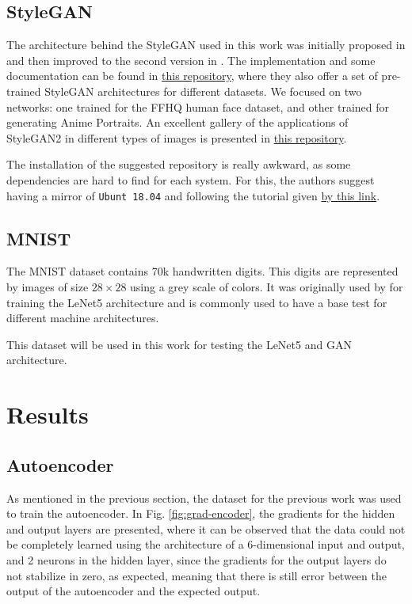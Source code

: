 \documentclass[conference]{IEEEtran}
\theoremstyle{definition}
\theoremstyle{remark}
\theoremstyle{remark}
\begin{document}
\subsection{StyleGAN}
The architecture behind the StyleGAN used in this work was initially proposed in
\parencite{karras2019style} and then improved to the second version in
\parencite{karras2020analyzing}. The implementation and some documentation can
be found in \href{https://github.com/NVlabs/stylegan2}{this repository}, where
they also offer a set of pre-trained StyleGAN architectures for different
datasets. We focused on two networks: one trained for the FFHQ human face
dataset, and other trained for generating Anime Portraits. An excellent gallery
of the applications of StyleGAN2 in different types of images is presented in
\href{https://github.com/justinpinkney/awesome-pretrained-stylegan2}{this
  repository}.

The installation of the suggested repository is really awkward, as some
dependencies are hard to find for each system. For this, the authors suggest
having a mirror of \texttt{Ubunt 18.04} and following the tutorial given
\href{https://bit.ly/2VUagNB}{by this link}.

\subsection{MNIST}
The MNIST dataset contains 70k handwritten digits. This digits are represented
by images of size $28 \times 28$ using a grey scale of colors. It was originally
used by \parencite{lecun1998gradient} for training the LeNet5 architecture and
is commonly used to have a base test for different machine architectures.

This dataset will be used in this work for testing the LeNet5 and GAN
architecture.

\section{Results}\label{sec:res}

\subsection{Autoencoder}
As mentioned in the previous section, the dataset for the previous work was used
to train the autoencoder. In Fig. \ref{fig:grad-encoder}, the gradients for the
hidden and output layers are presented, where it can be observed that the data
could not be completely learned using the architecture of a 6-dimensional input
and output, and 2 neurons in the hidden layer, since the gradients for the
output layers do not stabilize in zero, as expected, meaning that there is still
error between the output of the autoencoder and the expected output.
\end{document}
